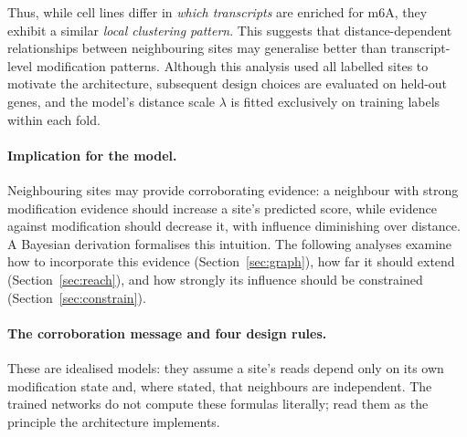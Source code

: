 \documentclass[11pt,a4paper]{article}
\begin{document}
Thus, while cell lines differ in \emph{which transcripts} are enriched for m6A, they exhibit a similar \emph{local clustering pattern}. This suggests that distance-dependent relationships between neighbouring sites may generalise better than transcript-level modification patterns. Although this analysis used all labelled sites to motivate the architecture, subsequent design choices are evaluated on held-out genes, and the model's distance scale $\lambda$ is fitted exclusively on training labels within each fold.

\paragraph{Implication for the model.}
Neighbouring sites may provide corroborating evidence: a neighbour with strong modification evidence should increase a site's predicted score, while evidence against modification should decrease it, with influence diminishing over distance. A Bayesian derivation formalises this intuition. The following analyses examine how to incorporate this evidence (Section~\ref{sec:graph}), how far it should extend (Section~\ref{sec:reach}), and how strongly its influence should be constrained (Section~\ref{sec:constrain}).


\paragraph{The corroboration message and four design rules.}
\label{app:message}
These are idealised models: they assume a site's reads depend only on its own
modification state and, where stated, that neighbours are independent. The
trained networks do not compute these formulas literally; read them as the
principle the architecture implements.
\end{document}
